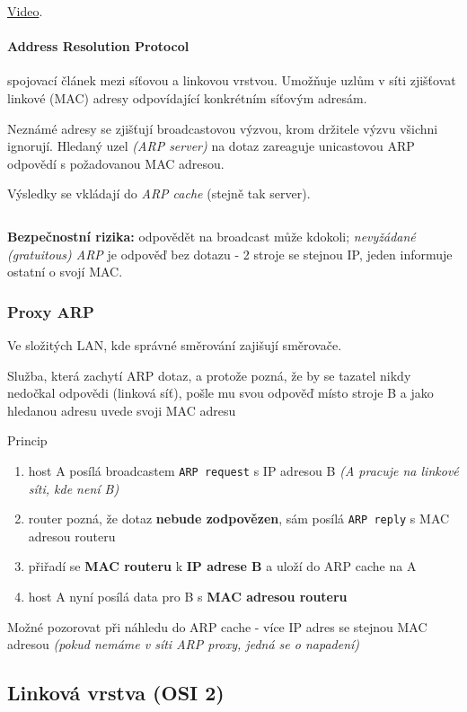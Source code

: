 \documentclass[10pt,a4paper]{article}
\begin{document}
\href{https://youtu.be/cn8Zxh9bPio}{Video}.

\paragraph*{Address Resolution Protocol} spojovací článek mezi síťovou a linkovou vrstvou. 
Umožňuje uzlům v síti zjišťovat linkové (MAC) adresy odpovídající konkrétním síťovým adresám.

Neznámé adresy se zjišťují broadcastovou výzvou, krom držitele výzvu všichni ignorují.
Hledaný uzel \textit{(ARP server)} na dotaz zareaguje unicastovou ARP odpovědí s požadovanou MAC adresou.

Výsledky se vkládají do \textit{ARP cache} (stejně tak server).

$ $

\textbf{Bezpečnostní rizika:} odpovědět na broadcast může kdokoli; \textit{nevyžádané (gratuitous) ARP} je odpověď bez dotazu - 2 stroje se stejnou IP, jeden informuje ostatní o svojí MAC.

\subsubsection{Proxy ARP}

Ve složitých LAN, kde správné směrování zajišují směrovače.

Služba, která zachytí ARP dotaz, a protože pozná, že by se tazatel nikdy nedočkal odpovědi (linková síť), 
pošle mu svou odpověď místo stroje B a jako hledanou adresu uvede svoji MAC adresu

Princip
\begin{enumerate}
    \item host A posílá broadcastem \texttt{ARP request} s IP adresou B \textit{(A pracuje na linkové síti, kde není B)}
    \item router pozná, že dotaz \textbf{nebude zodpovězen}, sám posílá \texttt{ARP reply} s MAC adresou routeru
    \item přiřadí se \textbf{MAC routeru} k \textbf{IP adrese B} a uloží do ARP cache na A
    \item host A nyní posílá data pro B s \textbf{MAC adresou routeru}
\end{enumerate}

Možné pozorovat při náhledu do ARP cache - více IP adres se stejnou MAC adresou \textit{(pokud nemáme v síti ARP proxy, jedná se o napadení)}


\subsection{Linková vrstva (OSI 2)}
\end{document}
